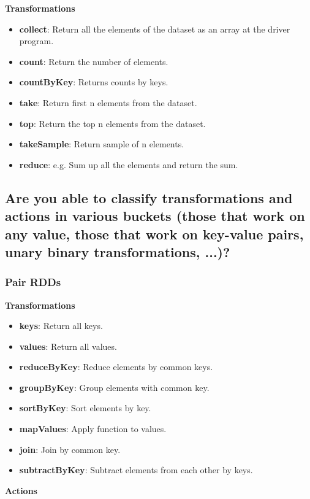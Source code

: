\documentclass{article}
\begin{document}
\textbf{Transformations}

\begin{itemize}
    \item \textbf{collect}: Return all the elements of the dataset as an array at the driver program.
    \item \textbf{count}: Return the number of elements. 
    \item \textbf{countByKey}: Returns counts by keys. 
    \item \textbf{take}: Return first n elements from the dataset. 
    \item \textbf{top}: Return the top n elements from the dataset.
    \item \textbf{takeSample}: Return sample of n elements. 
    \item \textbf{reduce}: e.g. Sum up all the elements and return the sum. 
\end{itemize}

\subsection{Are you able to classify transformations and actions in various buckets (those that work on any value, those that work on key-value pairs, unary binary transformations, ...)?}

\subsubsection{Pair RDDs}

\textbf{Transformations}

\begin{itemize}
    \item \textbf{keys}: Return all keys. 
    \item \textbf{values}: Return all values. 
    \item \textbf{reduceByKey}: Reduce elements by common keys. 
    \item \textbf{groupByKey}: Group elements with common key. 
    \item \textbf{sortByKey}: Sort elements by key. 
    \item \textbf{mapValues}: Apply function to values. 
    \item \textbf{join}: Join by common key. 
    \item \textbf{subtractByKey}: Subtract elements from each other by keys. 
\end{itemize}

\textbf{Actions}
\end{document}
